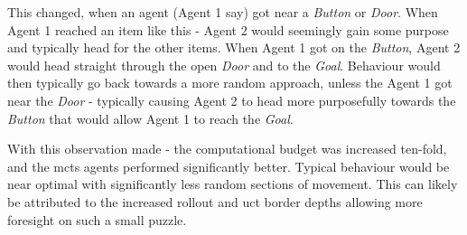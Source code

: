 \documentclass{IEEEtran}
\begin{document}
This changed, when an agent (Agent 1 say) got near a \emph{Button} or \emph{Door}. When Agent 1 reached an item like this - Agent 2 would seemingly gain some purpose and typically head for the other items. When Agent 1 got on the \emph{Button}, Agent 2 would head straight through the open \emph{Door} and to the \emph{Goal}. Behaviour would then typically go back towards a more random approach, unless the Agent 1 got near the \emph{Door} - typically causing Agent 2 to head more purposefully towards the \emph{Button} that would allow Agent 1 to reach the \emph{Goal}.

With this observation made - the computational budget was increased ten-fold, and the \gls{mcts} agents performed significantly better. Typical behaviour would be near optimal with significantly less random sections of movement. This can likely be attributed to the increased rollout and uct border depths allowing more foresight on such a small puzzle.
\end{document}
